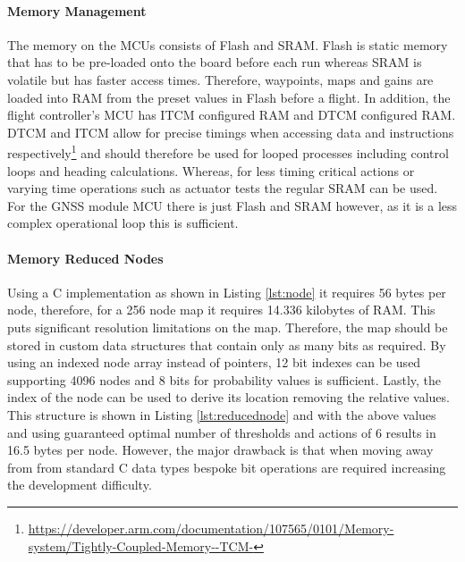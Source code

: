 \paragraph{Memory Management}
The memory on the \gls{MCU}s consists of Flash and \gls{SRAM}. Flash is static memory that has to be pre-loaded onto the board before each run whereas \gls{SRAM} is volatile but has faster access times. Therefore, waypoints, maps and gains are loaded into \gls{RAM} from the preset values in Flash before a flight. In addition, the flight controller's \gls{MCU} has \gls{ITCM} configured \gls{RAM} and \gls{DTCM} configured \gls{RAM}. \gls{DTCM} and \gls{ITCM} allow for precise timings when accessing data and instructions respectively\footnote{\url{https://developer.arm.com/documentation/107565/0101/Memory-system/Tightly-Coupled-Memory--TCM-}} and should therefore be used for looped processes including control loops and heading calculations. Whereas, for less timing critical actions or varying time operations such as actuator tests the regular \gls{SRAM} can be used. For the \gls{GNSS} module \gls{MCU} there is just Flash and \gls{SRAM} however, as it is a less complex operational loop this is sufficient. 

\paragraph{Memory Reduced Nodes}
Using a C implementation as shown in Listing \ref{lst:node} it requires 56 bytes per node, therefore, for a 256 node map it requires 14.336 kilobytes of \gls{RAM}. This puts significant resolution limitations on the map. Therefore, the map should be stored in custom data structures that contain only as many bits as required. By using an indexed node array instead of pointers, 12 bit indexes can be used supporting 4096 nodes and 8 bits for probability values is sufficient. Lastly, the index of the node can be used to derive its location removing the relative values. This structure is shown in Listing \ref{lst:reducednode} and with the above values and using guaranteed optimal number of thresholds and actions of 6 results in 16.5 bytes per node. However, the major drawback is that when moving away from from standard C data types bespoke bit operations are required increasing the development difficulty. 
